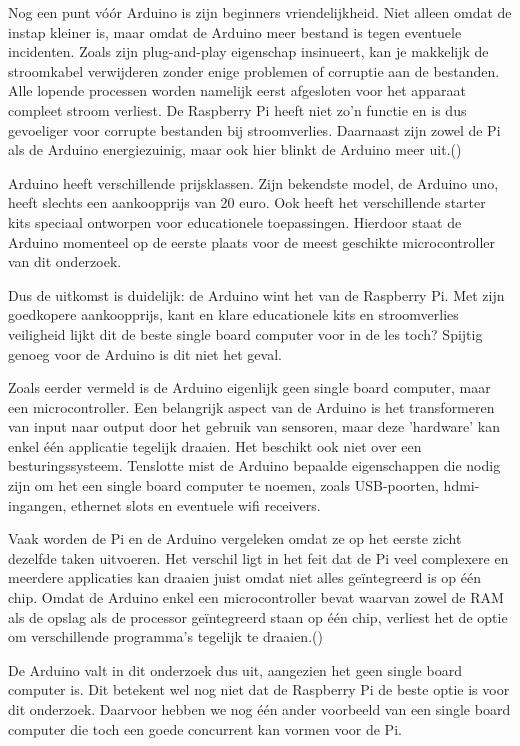 Nog een punt vóór Arduino is zijn beginners vriendelijkheid. Niet alleen omdat de instap kleiner is, maar omdat de Arduino meer bestand is tegen eventuele incidenten. Zoals zijn plug-and-play eigenschap insinueert, kan je makkelijk de stroomkabel verwijderen zonder enige problemen of corruptie aan de bestanden. Alle lopende processen worden namelijk eerst afgesloten voor het apparaat compleet stroom verliest. De Raspberry Pi heeft niet zo’n functie en is dus gevoeliger voor corrupte bestanden bij stroomverlies. Daarnaast zijn zowel de Pi als de Arduino energiezuinig, maar ook hier blinkt de Arduino meer uit.(\cite{Teja2021})

Arduino heeft verschillende prijsklassen. Zijn bekendste model, de Arduino uno, heeft slechts een aankoopprijs van 20 euro. Ook heeft het verschillende starter kits speciaal ontworpen voor educationele toepassingen. Hierdoor staat de Arduino momenteel op de eerste plaats voor de meest geschikte microcontroller van dit onderzoek.

Dus de uitkomst is duidelijk: de Arduino wint het van de Raspberry Pi. Met zijn goedkopere aankoopprijs, kant en klare educationele kits en stroomverlies veiligheid lijkt dit de beste single board computer voor in de les toch? Spijtig genoeg voor de Arduino is dit niet het geval. 

Zoals eerder vermeld is de Arduino eigenlijk geen single board computer, maar een microcontroller. Een belangrijk aspect van de Arduino is het transformeren van input naar output door het gebruik van sensoren, maar deze 'hardware' kan enkel één applicatie tegelijk draaien. Het beschikt ook niet over een besturingssysteem. Tenslotte mist de Arduino bepaalde eigenschappen die nodig zijn om het een single board computer te noemen, zoals USB-poorten, hdmi-ingangen, ethernet slots en eventuele wifi receivers.

Vaak worden de Pi en de Arduino vergeleken omdat ze op het eerste zicht dezelfde taken uitvoeren. Het verschil ligt in het feit dat de Pi veel complexere en meerdere applicaties kan draaien juist omdat niet alles geïntegreerd is op één chip. Omdat de Arduino enkel een microcontroller bevat waarvan zowel de RAM als de opslag als de processor geïntegreerd staan op één chip, verliest het de optie om verschillende programma’s tegelijk te draaien.(\cite{Teja2021,Keim2019,FreeCodeCamp2017})

De Arduino valt in dit onderzoek dus uit, aangezien het geen single board computer is. Dit betekent wel nog niet dat de Raspberry Pi de beste optie is voor dit onderzoek. Daarvoor hebben we nog één ander voorbeeld van een single board computer die toch een goede concurrent kan vormen voor de Pi. 


